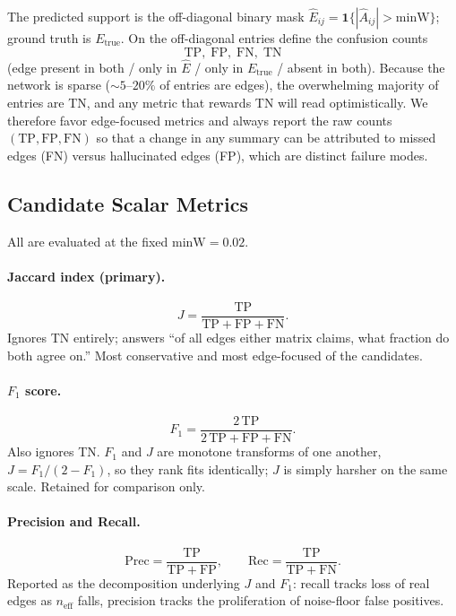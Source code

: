 \documentclass[11pt]{article}
\newcommand{\Ahat}{\hat{A}}
\newcommand{\Etrue}{E_{\mathrm{true}}}
\newcommand{\minW}{\mathrm{minW}}
\newcommand{\neff}{n_{\mathrm{eff}}}
\begin{document}
The predicted support is the off-diagonal binary mask
$\hat E_{ij} = \mathbf{1}\{|\Ahat_{ij}| > \minW\}$; ground truth is $\Etrue$.
On the off-diagonal entries define the confusion counts
\begin{equation}
  \mathrm{TP},\;\mathrm{FP},\;\mathrm{FN},\;\mathrm{TN}
\end{equation}
(edge present in both / only in $\hat E$ / only in $\Etrue$ / absent in both).
Because the network is sparse ($\sim 5$--$20\%$ of entries are edges), the
overwhelming majority of entries are TN, and any metric that rewards TN will
read optimistically. We therefore favor edge-focused metrics and always report
the raw counts $(\mathrm{TP},\mathrm{FP},\mathrm{FN})$ so that a change in any
summary can be attributed to missed edges (FN) versus hallucinated edges (FP),
which are distinct failure modes.

\subsection{Candidate Scalar Metrics}
All are evaluated at the fixed $\minW = 0.02$.

\paragraph{Jaccard index (primary).}
\begin{equation}
  J = \frac{\mathrm{TP}}{\mathrm{TP}+\mathrm{FP}+\mathrm{FN}}.
\end{equation}
Ignores TN entirely; answers ``of all edges either matrix claims, what
fraction do both agree on.'' Most conservative and most edge-focused of the
candidates.

\paragraph{$F_1$ score.}
\begin{equation}
  F_1 = \frac{2\,\mathrm{TP}}{2\,\mathrm{TP}+\mathrm{FP}+\mathrm{FN}}.
\end{equation}
Also ignores TN. $F_1$ and $J$ are monotone transforms of one another,
$J = F_1/(2-F_1)$, so they rank fits identically; $J$ is simply harsher on the
same scale. Retained for comparison only.

\paragraph{Precision and Recall.}
\begin{equation}
  \mathrm{Prec}=\frac{\mathrm{TP}}{\mathrm{TP}+\mathrm{FP}},\qquad
  \mathrm{Rec}=\frac{\mathrm{TP}}{\mathrm{TP}+\mathrm{FN}}.
\end{equation}
Reported as the decomposition underlying $J$ and $F_1$: recall tracks loss of
real edges as $\neff$ falls, precision tracks the proliferation of noise-floor
false positives.
\end{document}
